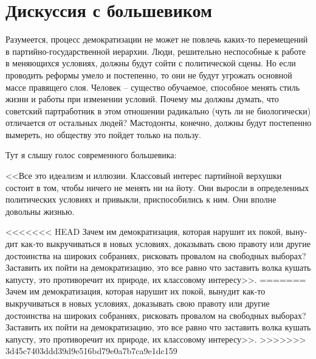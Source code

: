 \documentclass{book}
\begin{document}
\section{Дискуссия с большевиком}

Разумеется, процесс демократизации не может не повлечь каких-то перемещений в партийно-государственной иерархии. Люди, решительно неспособные к работе в меняющихся условиях, должны будут сойти с политической сцены. Но если проводить реформы умело и постепенно, то они не будут угрожать основной массе правящего слоя. Человек -- существо обучаемое, способное менять стиль жизни и работы при изменении условий. Почему мы должны думать, что советский партработник в этом отношении радикально (чуть ли не биологически) отличается от остальных людей? Мастодонты, конечно, должны будут постепенно вымереть, но обществу это пойдет только на пользу.

Тут я слышу голос современного большевика:

<<Все это идеализм и иллюзии. Классовый интерес партийной верхушки состоит в том, чтобы ничего не менять ни на йоту. Они выросли в определенных политических условиях и привыкли, приспособились к ним. Они вполне довольны жизнью.

<<<<<<< HEAD
Зачем им демократизация, которая нарушит их покой, выну­дит как‑то выкручиваться в новых условиях, доказывать свою правоту или другие достоинства на широких собраниях, риско­вать провалом на свободных выборах? Заставить их пойти на демократизацию, это все равно что заставить волка кушать капусту, это противоречит их природе, их классовому интересу>>.
=======
Зачем им демократизация, которая нарушит их покой, выну­дит как-то выкручиваться в новых условиях, доказывать свою правоту или другие достоинства на широких собраниях, риско­вать провалом на свободных выборах? Заставить их пойти на демократизацию, это все равно что заставить волка кушать капусту, это противоречит их природе, их классовому интересу>>.
>>>>>>> 3d45c7403ddd39d9e516bd79e0a7b7ca9e1dc159
\end{document}
